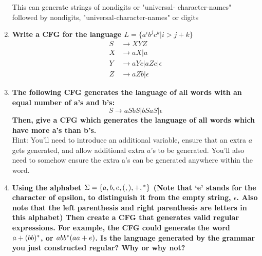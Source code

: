 \begin{enumerate}
This can generate strings of nondigits or "universal-
character-names" followed by nondigits, "universal-character-names" or
digits
\newpage
\item \textbf{Write a CFG for the language $L = \{ a^ib^jc^k | i>j+k\}$
}
    \begin{equation*}
      \begin{aligned}
        S &\rightarrow XYZ\\
        X &\rightarrow aX | a\\
        Y &\rightarrow aYc | aZc | \epsilon\\
        Z &\rightarrow aZb | \epsilon
      \end{aligned}
    \end{equation*}
\newpage
\item \textbf{The following CFG generates the language of all words with an
equal number of a's and b's:
\[S \rightarrow aSbS | bSaS | \epsilon\]
Then, give a CFG which generates the language of all words which have more
a's than b's.}\\
Hint: You'll need to introduce an additional variable, ensure that an extra
$a$ gets generated, and allow additional extra $a$'s to be generated. You'll
also need to somehow ensure the extra a's can be generated anywhere within
the word.

\newpage
\item \textbf{Using the alphabet $\Sigma = \{a, b, e, (, ), +, {}^\ast\}$
(Note that `e' stands for the character of epsilon, to distinguish it from
the empty string, $\epsilon$. Also note that the left parenthesis and right
parenthesis are letters in this alphabet) Then create a CFG that generates
valid regular expressions. For example, the CFG could generate the word
$a+(bb){}^\ast$, or $abb{}^\ast(aa+e)$.  Is the language generated by the
grammar you just constructed regular? Why or why not?}

\end{enumerate}


